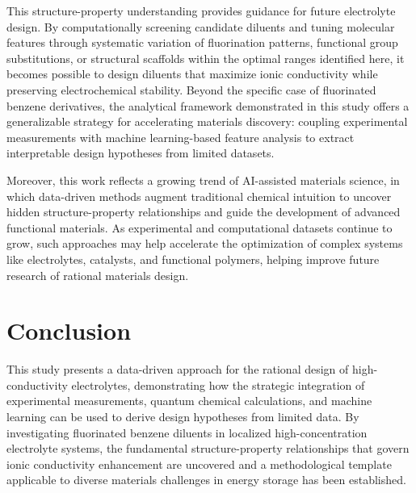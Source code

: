 \documentclass[11pt, a4paper]{article}
\begin{document}
This structure-property understanding provides guidance for future electrolyte design. By computationally screening candidate diluents and tuning molecular features through systematic variation of fluorination patterns, functional group substitutions, or structural scaffolds within the optimal ranges identified here, it becomes possible to design diluents that maximize ionic conductivity while preserving electrochemical stability. Beyond the specific case of fluorinated benzene derivatives, the analytical framework demonstrated in this study offers a generalizable strategy for accelerating materials discovery: coupling experimental measurements with machine learning-based feature analysis to extract interpretable design hypotheses from limited datasets.

Moreover, this work reflects a growing trend of AI-assisted materials science, in which data-driven methods augment traditional chemical intuition to uncover hidden structure-property relationships and guide the development of advanced functional materials. As experimental and computational datasets continue to grow, such approaches may help accelerate the optimization of complex systems like electrolytes, catalysts, and functional polymers, helping improve future research of rational materials design.

\clearpage

\section{Conclusion}

This study presents a data-driven approach for the rational design of high-conductivity electrolytes, demonstrating how the strategic integration of experimental measurements, quantum chemical calculations, and machine learning can be used to derive design hypotheses from limited data. By investigating fluorinated benzene diluents in localized high-concentration electrolyte systems, the fundamental structure-property relationships that govern ionic conductivity enhancement are uncovered and a methodological template applicable to diverse materials challenges in energy storage has been established.
\end{document}
